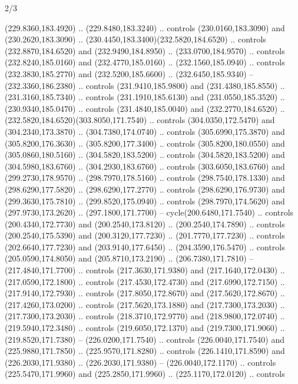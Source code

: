 \begin{flagdescription}{2/3}
\begin{scope}[xshift=0.5\flaglength,yshift=0.5\flagwidth,scale=\flagwidth/259.2]
\begin{scope}[y=0.8pt, x=0.8pt, yscale=-1,shift={(-243,-162)}]
      (229.8360,183.4920) .. (229.8480,183.3240) .. controls (230.0160,183.3090) and
      (230.2620,183.3090) .. (230.4450,183.3400)(232.5820,184.6520) .. controls
      (232.8870,184.6520) and (232.9490,184.8950) .. (233.0700,184.9570) .. controls
      (232.8240,185.0160) and (232.4770,185.0160) .. (232.1560,185.0940) .. controls
      (232.3830,185.2770) and (232.5200,185.6600) .. (232.6450,185.9340) --
      (232.3360,186.2380) .. controls (231.9410,185.9800) and (231.4380,185.8550) ..
      (231.3160,185.7340) .. controls (231.1910,185.6130) and (231.0550,185.3520) ..
      (230.9340,185.0470) .. controls (231.4840,185.0040) and (232.2770,184.6520) ..
      (232.5820,184.6520)(303.8050,171.7540) .. controls (304.0350,172.5470) and
      (304.2340,173.3870) .. (304.7380,174.0740) .. controls (305.6990,175.3870) and
      (305.8200,176.3630) .. (305.8200,177.3400) .. controls (305.8200,180.0550) and
      (305.0860,180.5160) .. (304.5820,183.5200) .. controls (304.5820,183.5200) and
      (304.5980,183.6760) .. (304.2930,183.6760) .. controls (303.6050,183.6760) and
      (299.2730,178.9570) .. (298.7970,178.5160) .. controls (298.7540,178.1330) and
      (298.6290,177.5820) .. (298.6290,177.2770) .. controls (298.6290,176.9730) and
      (299.3630,175.7810) .. (299.8520,175.0940) .. controls (298.7970,174.5620) and
      (297.9730,173.2620) .. (297.1800,171.7700) -- cycle(200.6480,171.7540) ..
      controls (200.4340,172.7730) and (200.2540,173.8120) .. (200.2540,174.7890) ..
      controls (200.2540,175.5390) and (200.3120,177.7230) .. (201.7770,177.7230) ..
      controls (202.6640,177.7230) and (203.9140,177.6450) .. (204.3590,176.5470) ..
      controls (205.0590,174.8050) and (205.8710,173.2190) .. (206.7380,171.7810) --
      (217.4840,171.7700) .. controls (217.3630,171.9380) and (217.1640,172.0430) ..
      (217.0590,172.1800) .. controls (217.4530,172.4730) and (217.6990,172.7150) ..
      (217.9140,172.7930) .. controls (217.8050,172.8670) and (217.5620,172.8670) ..
      (217.4260,173.0200) .. controls (217.5620,173.1880) and (217.7300,173.2030) ..
      (217.7300,173.2030) .. controls (218.3710,172.9770) and (218.9800,172.0740) ..
      (219.5940,172.3480) .. controls (219.6050,172.1370) and (219.7300,171.9060) ..
      (219.8520,171.7380) -- (226.0200,171.7540) .. controls (226.0040,171.7540) and
      (225.9880,171.7850) .. (225.9570,171.8280) .. controls (226.1410,171.8590) and
      (226.2030,171.9380) .. (226.2030,171.9380) -- (226.0040,172.1170) .. controls
      (225.5470,171.9960) and (225.2850,171.9960) .. (225.1170,172.0120) .. controls

\end{scope}
\end{scope}
\end{flagdescription}
